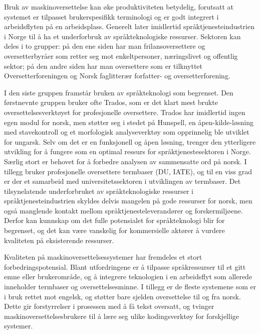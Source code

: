 \begin{multicols}{2}

Bruk av maskinoversettelse kan øke produktiviteten betydelig, forutsatt at systemet er tilpasset brukerspesifikk terminologi og er godt integrert i arbeidsflyten på en arbeidsplass. Generelt later imidlertid språktjenesteindustrien i Norge til å ha et underforbruk av språkteknologiske ressurser. 
Sektoren kan deles i to grupper: på den ene siden har man frilansoversettere og oversetterbyråer som retter seg mot enkeltpersoner, næringslivet og offentlig sektor; på den andre siden har man oversettere som er tilknyttet Oversetterforeningen og Norsk faglitterær forfatter- og oversetterforening.

I den siste gruppen framstår bruken av språkteknologi som begrenset. Den førstnevnte gruppen bruker ofte Trados, som er det klart mest brukte oversettelsesverktøyet for profesjonelle oversettere. Trados har imidlertid ingen egen modul for norsk, men støtter seg i stedet på Hunspell, en åpen-kilde-løsning med stavekontroll og et morfologisk analyseverktøy som opprinnelig ble utviklet for ungarsk. Selv om det er en funksjonell og åpen løsning, trenger den ytterligere utvikling for å fungere som en optimal ressurs for språktjenestesektoren i Norge. Særlig stort er behovet for å forbedre analysen av sammensatte ord på norsk. I tillegg bruker profesjonelle oversettere termbaser (DU, IATE), og til en viss grad er der et samarbeid med universitetssektoren i utviklingen av termbaser. Det tilsynelatende underforbruket av språkteknologiske ressurser i språktjenesteindustrien skyldes delvis mangelen på gode ressurser for norsk, men også manglende kontakt mellom språktjenesteleverandører og forskermiljøene. Derfor kan kunnskap om det fulle potensialet for språkteknologi blir for begrenset, og det kan være vanskelig for kommersielle aktører å vurdere kvaliteten på eksisterende ressurser.

Kvaliteten på maskinoversettelsessystemer har fremdeles et stort forbedringspotensial. Blant utfordringene er å tilpasse språkressurser til et gitt emne eller brukerområde, og å integrere teknologien i en arbeidsflyt som allerede inneholder termbaser og oversettelsesminne. I tillegg er de fleste systemene som er i bruk rettet mot engelsk, og støtter bare sjelden oversettelse til og fra norsk. Dette gir forstyrrelser i prosessen med å få tekst oversatt, og tvinger maskinoversettelsesbrukere til å lære seg ulike kodingsverktøy for forskjellige systemer.


\end{multicols}
